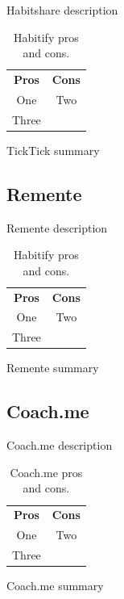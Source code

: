 Habitshare description

\begin{table}[h!]
    \centering
    \begin{ctucolortab}
        \begin{tabular}{cc}
            \bfseries Pros & \bfseries Cons\\\Midrule
            One & Two\\
            Three & \\
        \end{tabular}
    \end{ctucolortab}
    \caption{Habitify pros and cons.}\label{tab:habitshare-pros-cons}
\end{table}

TickTick summary


\subsection{Remente}\label{subsec:remente}

Remente description

\begin{table}[h!]
    \centering
    \begin{ctucolortab}
        \begin{tabular}{cc}
            \bfseries Pros & \bfseries Cons\\\Midrule
            One & Two\\
            Three & \\
        \end{tabular}
    \end{ctucolortab}
    \caption{Habitify pros and cons.}\label{tab:remente-pros-cons}
\end{table}

Remente summary


\subsection{Coach.me}\label{subsec:coachme}

Coach.me description

\begin{table}[h!]
    \centering
    \begin{ctucolortab}
        \begin{tabular}{cc}
            \bfseries Pros & \bfseries Cons\\\Midrule
            One & Two\\
            Three & \\
        \end{tabular}
    \end{ctucolortab}
    \caption{Coach.me pros and cons.}\label{tab:coachme-pros-cons}
\end{table}

Coach.me summary

